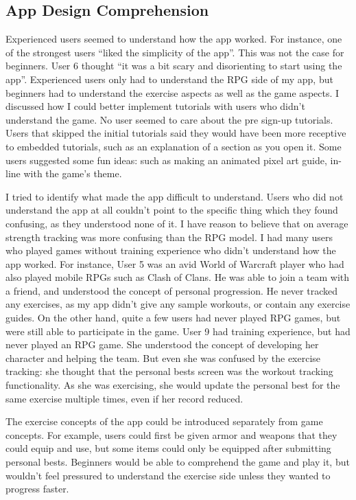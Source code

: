\documentclass{l4proj}
\begin{document}
\subsection{App Design Comprehension}
Experienced users seemed to understand how the app worked. For instance, one of the strongest users ``liked the simplicity of the app''. This was not the case for beginners. User 6 thought ``it was a bit scary and disorienting to start using the app''. Experienced users only had to understand the RPG side of my app, but beginners had to understand the exercise aspects as well as the game aspects. I discussed how I could better implement tutorials with users who didn't understand the game. No user seemed to care about the pre sign-up tutorials. Users that skipped the initial tutorials said they would have been more receptive to embedded tutorials, such as an explanation of a section as you open it. Some users suggested some fun ideas: such as making an animated pixel art guide, in-line with the game's theme.

I tried to identify what made the app difficult to understand. Users who did not understand the app at all couldn't point to the specific thing which they found confusing, as they understood none of it. I have reason to believe that on average strength tracking was more confusing than the RPG model. I had many users who played games without training experience who didn't understand how the app worked. For instance, User 5 was an avid World of Warcraft player who had also played mobile RPGs such as Clash of Clans. He was able to join a team with a friend, and understood the concept of personal progression. He never tracked any exercises, as my app didn't give any sample workouts, or contain any exercise guides. On the other hand, quite a few users had never played RPG games, but were still able to participate in the game. User 9 had training experience, but had never played an RPG game. She understood the concept of developing her character and helping the team. But even she was confused by the exercise tracking: she thought that the personal bests screen was the workout tracking functionality. As she was exercising, she would update the personal best for the same exercise multiple times, even if her record reduced. 

The exercise concepts of the app could be introduced separately from game concepts. For example, users could first be given armor and weapons that they could equip and use, but some items could only be equipped after submitting personal bests. Beginners would be able to comprehend the game and play it, but wouldn't feel pressured to understand the exercise side unless they wanted to progress faster. 
\end{document}
